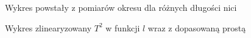 \documentclass[a4paper,10pt,twoside]{article}
\begin{document}
	\begin{figure}[h]
		\caption{Wykres powstały z pomiarów okresu dla różnych długości nici}
	\end{figure}
	
	\begin{figure}[h]
		\caption{Wykres zlinearyzowany $T^2$
						w funkcji 
			$l$ wraz z dopasowaną prostą}
	\end{figure}
	
\end{document}
